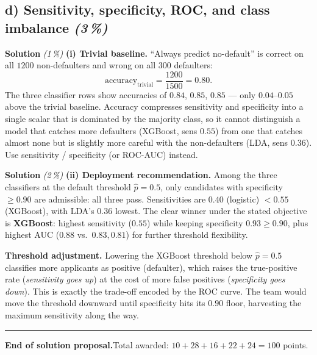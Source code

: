 \documentclass[11pt,a4paper]{article}
\newcommand{\subpoints}[1]{\textit{(#1\,\%)}}
\newcommand{\sol}{\noindent\textbf{Solution}}
\begin{document}
\subsection*{d) Sensitivity, specificity, ROC, and class imbalance \subpoints{3}}

\sol{} \subpoints{1} \textbf{(i) Trivial baseline.} ``Always predict no-default'' is correct on all
$1200$ non-defaulters and wrong on all $300$ defaulters:
$$\text{accuracy}_{\text{trivial}} = \frac{1200}{1500} = \boxed{0.80}.$$
The three classifier rows show accuracies of $0.84$, $0.85$, $0.85$ --- only $0.04$--$0.05$ above
the trivial baseline. Accuracy compresses sensitivity and specificity into a single scalar that is
dominated by the majority class, so it cannot distinguish a model that catches more defaulters
(XGBoost, sens $0.55$) from one that catches almost none but is slightly more careful with the
non-defaulters (LDA, sens $0.36$). Use sensitivity / specificity (or ROC-AUC) instead.

\medskip
\sol{} \subpoints{2} \textbf{(ii) Deployment recommendation.} Among the three classifiers at the
default threshold $\hat p = 0.5$, only candidates with specificity $\geq 0.90$ are admissible: all
three pass. Sensitivities are $0.40$ (logistic) $< 0.55$ (XGBoost), with LDA's $0.36$ lowest. The
clear winner under the stated objective is \textbf{XGBoost}: highest sensitivity ($0.55$) while
keeping specificity $0.93 \geq 0.90$, plus highest AUC ($0.88$ vs.\ $0.83, 0.81$) for further
threshold flexibility.

\textbf{Threshold adjustment.} Lowering the XGBoost threshold below $\hat p = 0.5$ classifies more
applicants as positive (defaulter), which raises the true-positive rate (\emph{sensitivity goes
up}) at the cost of more false positives (\emph{specificity goes down}). This is exactly the
trade-off encoded by the ROC curve. The team would move the threshold downward until specificity
hits its $0.90$ floor, harvesting the maximum sensitivity along the way.

\vspace{1em}
\hrule
\vspace{0.5em}

\noindent\textbf{End of solution proposal.}\quad Total awarded: $10 + 28 + 16 + 22 + 24 = 100$ points.
\end{document}
